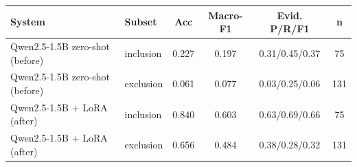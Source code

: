 \begin{tabular}{llcccc}\toprule System & Subset & Acc & Macro-F1 & Evid. P/R/F1 & n\\\midrule
Qwen2.5-1.5B zero-shot (before) & inclusion & 0.227 & 0.197 & 0.31/0.45/0.37 & 75\\
Qwen2.5-1.5B zero-shot (before) & exclusion & 0.061 & 0.077 & 0.03/0.25/0.06 & 131\\
Qwen2.5-1.5B + LoRA (after) & inclusion & 0.840 & 0.603 & 0.63/0.69/0.66 & 75\\
Qwen2.5-1.5B + LoRA (after) & exclusion & 0.656 & 0.484 & 0.38/0.28/0.32 & 131\\
\bottomrule\end{tabular}